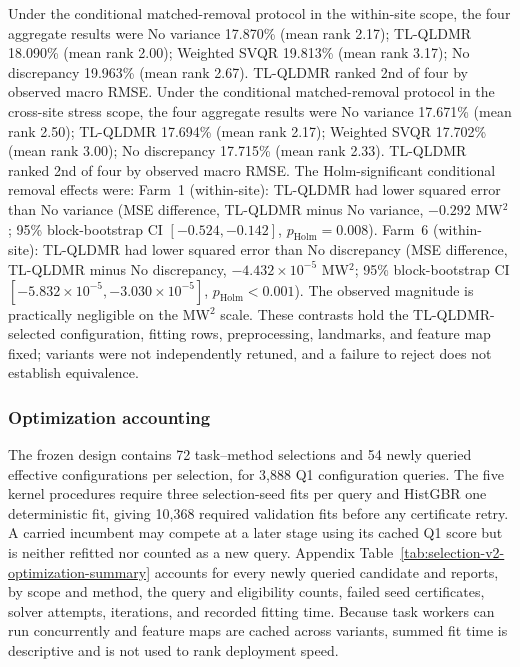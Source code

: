 {\color{blue}Under the conditional matched-removal protocol in the within-site scope, the four aggregate results were No variance 17.870\% (mean rank 2.17); TL-QLDMR 18.090\% (mean rank 2.00); Weighted SVQR 19.813\% (mean rank 3.17); No discrepancy 19.963\% (mean rank 2.67). TL-QLDMR ranked 2nd of four by observed macro RMSE. Under the conditional matched-removal protocol in the cross-site stress scope, the four aggregate results were No variance 17.671\% (mean rank 2.50); TL-QLDMR 17.694\% (mean rank 2.17); Weighted SVQR 17.702\% (mean rank 3.00); No discrepancy 17.715\% (mean rank 2.33). TL-QLDMR ranked 2nd of four by observed macro RMSE. The Holm-significant conditional removal effects were: Farm~1 (within-site): TL-QLDMR had lower squared error than No variance (MSE difference, TL-QLDMR minus No variance, $-0.292$ MW$^2$; 95\% block-bootstrap CI $[-0.524, -0.142]$, $p_{\mathrm{Holm}}=0.008$). Farm~6 (within-site): TL-QLDMR had lower squared error than No discrepancy (MSE difference, TL-QLDMR minus No discrepancy, $-4.432\times 10^{-5}$ MW$^2$; 95\% block-bootstrap CI $[-5.832\times 10^{-5}, -3.030\times 10^{-5}]$, $p_{\mathrm{Holm}}<0.001$). The observed magnitude is practically negligible on the MW$^2$ scale. These contrasts hold the TL-QLDMR-selected configuration, fitting rows, preprocessing, landmarks, and feature map fixed; variants were not independently retuned, and a failure to reject does not establish equivalence.}

\subsubsection{Optimization accounting}
{\color{blue}The frozen design contains 72 task--method selections and 54 newly queried effective configurations per selection, for 3,888 Q1 configuration queries. The five kernel procedures require three selection-seed fits per query and HistGBR one deterministic fit, giving 10,368 required validation fits before any certificate retry. A carried incumbent may compete at a later stage using its cached Q1 score but is neither refitted nor counted as a new query. Appendix Table~\ref{tab:selection-v2-optimization-summary} accounts for every newly queried candidate and reports, by scope and method, the query and eligibility counts, failed seed certificates, solver attempts, iterations, and recorded fitting time. Because task workers can run concurrently and feature maps are cached across variants, summed fit time is descriptive and is not used to rank deployment speed.}

